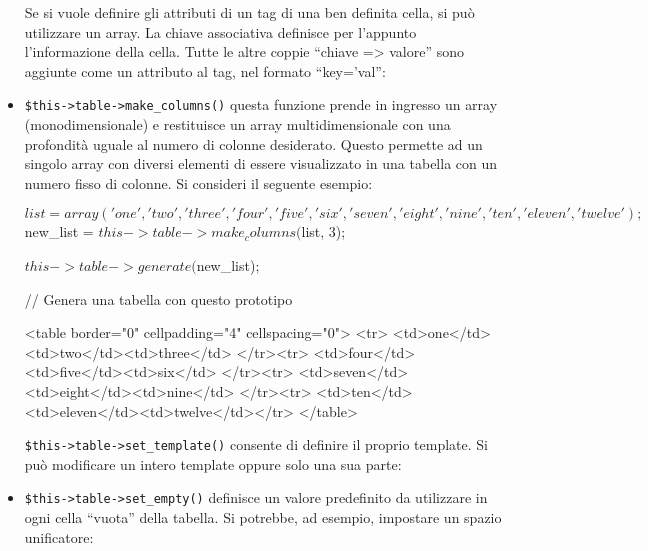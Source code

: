 \begin{itemize}
Se si vuole definire gli attributi di un tag di una ben definita cella, si può utilizzare un array. La chiave associativa  definisce per l'appunto l'informazione della cella. Tutte le altre coppie ``chiave => valore'' sono aggiunte come un attributo al tag, nel formato ``key='val'':


\item \verb|$this->table->make_columns()| questa funzione prende in ingresso un array (monodimensionale) e restituisce un array multidimensionale con una profondità uguale al numero di colonne desiderato. Questo permette ad un singolo array con diversi elementi di essere visualizzato in una tabella con un numero fisso di colonne. Si consideri il seguente esempio:

\begin{html}
$list = array('one', 'two', 'three', 'four', 'five', 'six', 'seven', 'eight', 'nine', 'ten', 'eleven', 'twelve');

$new_list = $this->table->make_columns($list, 3);

$this->table->generate($new_list);

// Genera una tabella con questo prototipo

<table border="0" cellpadding="4" cellspacing="0">
<tr>
<td>one</td><td>two</td><td>three</td>
</tr><tr>
<td>four</td><td>five</td><td>six</td>
</tr><tr>
<td>seven</td><td>eight</td><td>nine</td>
</tr><tr>
<td>ten</td><td>eleven</td><td>twelve</td></tr>
</table>
\end{html}

\verb|$this->table->set_template()| consente di definire il proprio template. Si può modificare un intero template oppure solo una sua parte:


\item \verb|$this->table->set_empty()| definisce un valore predefinito da utilizzare in ogni cella ``vuota'' della tabella. Si potrebbe, ad esempio, impostare un spazio unificatore:


\end{itemize}

